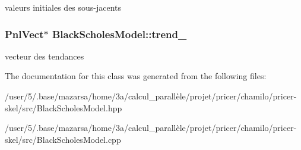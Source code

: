 valeurs initiales des sous-\/jacents \hypertarget{classBlackScholesModel_af92b535c61f17e7a16af56952739302f}{
\subsubsection[{trend\-\_\-}]{\setlength{\rightskip}{0pt plus 5cm}Pnl\-Vect$\ast$ Black\-Scholes\-Model\-::trend\-\_\-}}\label{classBlackScholesModel_af92b535c61f17e7a16af56952739302f}
vecteur des tendances 

The documentation for this class was generated from the following files\-:\begin{DoxyCompactItemize}
\item 
/user/5/.\-base/mazarsa/home/3a/calcul\-\_\-parallèle/projet/pricer/chamilo/pricer-\/skel/src/Black\-Scholes\-Model.\-hpp\item 
/user/5/.\-base/mazarsa/home/3a/calcul\-\_\-parallèle/projet/pricer/chamilo/pricer-\/skel/src/Black\-Scholes\-Model.\-cpp\end{DoxyCompactItemize}
